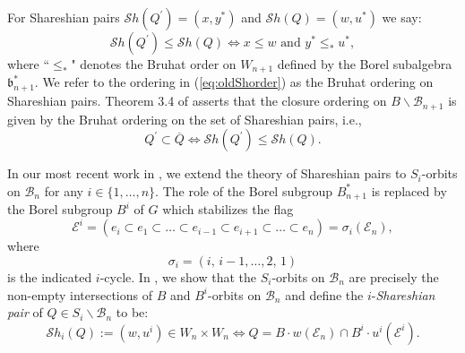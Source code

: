 \documentclass[12pt]{amsart}
\numberwithin{equation}{section}
\newcommand{\Wn}{{W}_n}
\newcommand{\fb}{\mbox{${\mathfrak b}$}}
\newcommand{\B}{\mathcal{B}}
\newcommand{\Sh}{\mathcal{S}h}
\begin{document}
 
 For Shareshian pairs $\Sh(Q^{\prime})=(x, y^{*})$ and $\Sh(Q)=(w,u^{*})$ we say:
 \begin{equation}\label{eq:oldShorder}
 \Sh(Q^{\prime})\leq \Sh(Q)\Leftrightarrow x\leq w \mbox{ and } y^{*}\leq_{*} u^{*},
 \end{equation}
 where ``$\leq_{*}$" denotes the Bruhat order on $W_{n+1}$ defined by the Borel subalgebra $\fb_{n+1}^{*}$.  We refer to the ordering in (\ref{eq:oldShorder}) as the Bruhat ordering on Shareshian pairs.  
 Theorem 3.4 of \cite{Shpairs} asserts that the closure ordering on $B\backslash \B_{n+1}$ is given by the Bruhat ordering on the set of Shareshian pairs, i.e., 
 \begin{equation}\label{eq:oldShclosure}
 Q^{\prime}\subset\overline{Q}\Leftrightarrow \Sh(Q^{\prime})\leq \Sh(Q).
 \end{equation}
 
 
 
 In our most recent work in \cite{Siorbits}, we extend the theory 
 of Shareshian pairs to $S_{i}$-orbits on $\B_{n}$ for any $i\in \{1,\dots, n\}$.  The role of the Borel subgroup $B_{n+1}^{*}$ is replaced by the Borel subgroup $B^{i}$ of $G$ which stabilizes the flag 
  \begin{equation}\label{eq:Eiflag}
 \mathcal{E}^{i}=(e_{i}\subset e_{1}\subset\dots\subset e_{i-1}\subset e_{i+1}\subset\dots\subset e_{n}) = \sigma_{i}(\mathcal{E}_{n}),
 \end{equation}
where 
\begin{equation}\label{e:sigmai}
\sigma_{i} = (i,\,i-1,\dots, 2, \,1)
\end{equation}
is the indicated $i$-cycle.   
 In \cite{Siorbits}, we show that the $S_{i}$-orbits on $\B_{n}$ are precisely the non-empty intersections of $B$ and $B^{i}$-orbits on $\B_{n}$ and define the $i$-\emph{Shareshian pair} of $Q\in S_{i}\backslash\B_{n}$ to be:
 \begin{equation}\label{eq:iShdefn}
 \Sh_{i}(Q):=(w, u^{i})\in \Wn\times \Wn \Leftrightarrow Q=B\cdot w(\mathcal{E}_{n})\cap B^{i}\cdot u^{i}(\mathcal{E}^{i}).  
 \end{equation}
 
\end{document}
